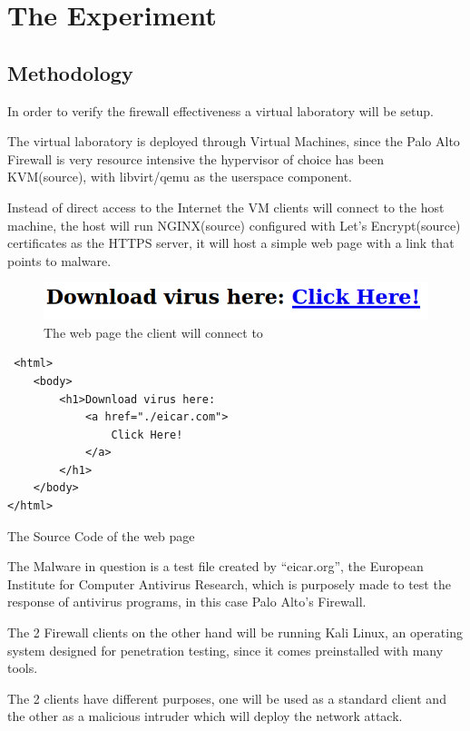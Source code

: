 \documentclass[status=normal,cover=tesi,language=en]{gmeepd}
\begin{document}
\chapter{The Experiment}
\section{Methodology}

In order to verify the firewall effectiveness a virtual laboratory will be setup.

The virtual laboratory is deployed through Virtual Machines, since the Palo Alto Firewall is very resource intensive the hypervisor of choice has been KVM(source), with libvirt/qemu as the userspace component.

Instead of direct access to the Internet the VM clients will connect to the host machine, the host will run NGINX(source) configured with Let's Encrypt(source) certificates as the HTTPS server, it will host a simple web page with a link that points to malware.

\begin{figure}[h!]
 \centering
 \includegraphics[width=13cm]{img/webpage.png}
 \caption{The web page the client will connect to}
 \label{fig: webpage}
\end{figure}

\begin{verbatim}
 <html>
    <body>
        <h1>Download virus here:
            <a href="./eicar.com">
                Click Here!
            </a>
        </h1>
    </body>
</html>
\end{verbatim}

\begin{center}
The Source Code of the web page
\end{center}


The Malware in question is a test file created by ``eicar.org'', the European Institute for Computer Antivirus Research, which is purposely made to test the response of antivirus programs\cite{eicar}, in this case Palo Alto's Firewall.

The 2 Firewall clients on the other hand will be running  Kali Linux, an operating system designed for penetration testing, since it comes preinstalled with many tools.

The 2 clients have different purposes, one will be used as a standard client and the other as a malicious intruder which will deploy the network attack.
\end{document}
